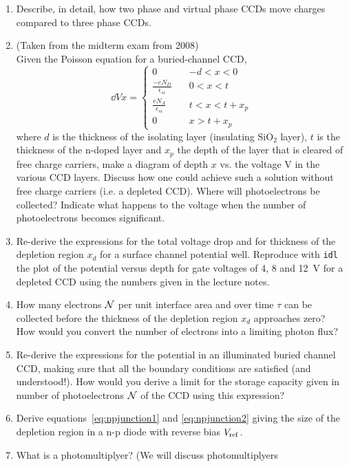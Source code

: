 \begin{enumerate}
\item Describe, in detail, how two phase and virtual phase CCDs move charges
compared to three phase CCDs.
\item (Taken from the midterm exam from 2008) \\
	Given the Poisson equation for a buried-channel CCD,
	\[
  \dd{V}{x} = \left\{ \begin{array}{ll} 
	0 & -d < x < 0 \\
	\frac{\displaystyle -eN_D}{\displaystyle \epsilon_{si}} \quad &
	0 < x < t \\
	\frac{\displaystyle eN_A}{\displaystyle\epsilon_{si}} & 
	t < x < t+x_p \\
	0 & x > t+x_p
  \end{array} \right.
  \label{CCD.Poissonbur}
	\]
	where $d$ is the thickness of the isolating layer (insulating Si$\mathrm{O}_2$
	layer), $t$ is the thickness of the n-doped layer and $x_p$ the depth of the
	layer that is cleared of free charge carriers, make a diagram of depth
	$x$ vs. the voltage V in the various CCD layers. Discuss how one could achieve
	such a solution without free charge carriers (i.e. a depleted CCD). Where will
	photoelectrons be collected? Indicate what happens to the voltage when the
	number of photoelectrons becomes significant.
\item Re-derive the expressions for the total voltage drop and for thickness 
of the depletion region $x_d$ for a surface channel potential well. Reproduce
with {\tt idl} the plot of the potential versus depth for gate voltages of 
4, 8 and 12~V for a depleted CCD using the numbers given in the lecture notes.
\item How many electrons $\cal{N}$ per unit interface area and over time $\tau$
can be collected before the thickness of the depletion region $x_d$ 
approaches zero? How would you convert the number of electrons into a limiting
photon flux?
\item Re-derive the expressions for the potential in an illuminated buried
channel CCD, making sure that all the boundary conditions are satisfied (and 
understood!). How would you derive a limit for the storage capacity given 
in number of photoelectrons $\cal{N}$ of the CCD using this
expression?
\item Derive equations~\ref{eq:npjunction1} and \ref{eq:npjunction2}
  giving the size of the depletion region in a n-p diode with reverse
  bias $V_{\rm ref}$.
\item What is a photomultiplyer? (We will discuss photomultiplyers

\end{enumerate}
